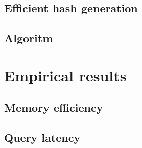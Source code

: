 \documentclass[12pt]{article}
\begin{document}
\subsection*{Efficient hash generation}

\subsection*{Algoritm}

\section*{Empirical results}

\subsection*{Memory efficiency}

\subsection*{Query latency}
\end{document}
